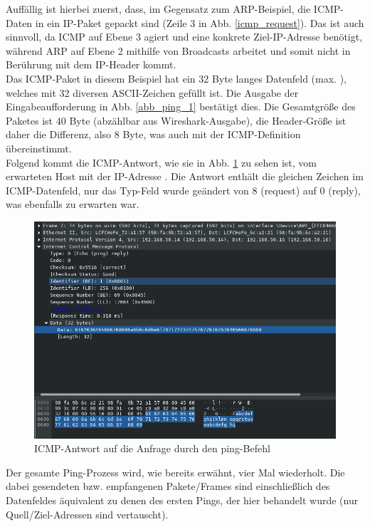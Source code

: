 Auffällig ist hierbei zuerst, dass, im Gegensatz zum ARP-Beispiel, die ICMP-Daten in ein IP-Paket gepackt sind (Zeile 3 in Abb. \ref{icmp_request}). Das ist auch sinnvoll, da ICMP auf Ebene 3 agiert und eine konkrete Ziel-IP-Adresse benötigt, während ARP auf Ebene 2 mithilfe von Broadcasts arbeitet und somit nicht in Berührung mit dem IP-Header kommt.\\

Das ICMP-Paket in diesem Beispiel hat ein 32 Byte langes Datenfeld (max. ), welches mit 32 diversen ASCII-Zeichen gefüllt ist. Die Ausgabe der Eingabeaufforderung in Abb. \ref{abb_ping_1} bestätigt dies. Die Gesamtgröße des Paketes ist 40 Byte (abzählbar aus Wireshark-Ausgabe), die Header-Größe ist daher die Differenz, also 8 Byte, was auch mit der ICMP-Definition übereinstimmt.\\

Folgend kommt die ICMP-Antwort, wie sie in Abb. \ref{icmp_answer} zu sehen ist, vom erwarteten Host mit der  IP-Adresse . Die Antwort enthält die gleichen Zeichen im ICMP-Datenfeld, nur das Typ-Feld wurde geändert von 8 (request) auf 0 (reply), was ebenfalls zu erwarten war.

\begin{figure}[H]
  \begin{center}
\includegraphics[width=\textwidth]{graphics/versuch/3_3/wireshark/ping_answer}
    \caption{ICMP-Antwort auf die Anfrage durch den ping-Befehl}\label{icmp_answer}
  \end{center}
\end{figure}

Der gesamte Ping-Prozess wird, wie bereits erwähnt, vier Mal wiederholt. Die dabei gesendeten bzw. empfangenen Pakete/Frames sind einschließlich des Datenfeldes äquivalent zu denen des ersten Pings, der hier behandelt wurde (nur Quell/Ziel-Adressen sind vertauscht).\\

